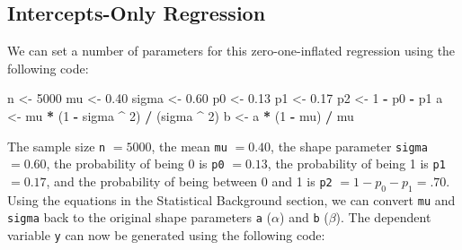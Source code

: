 \documentclass[english,man]{apa6}
\newenvironment{Shaded}{\begin{snugshade}}{\end{snugshade}}
\newcommand{\DecValTok}[1]{\textcolor[rgb]{0.00,0.00,0.81}{#1}}
\newcommand{\FloatTok}[1]{\textcolor[rgb]{0.00,0.00,0.81}{#1}}
\newcommand{\StringTok}[1]{\textcolor[rgb]{0.31,0.60,0.02}{#1}}
\newcommand{\OperatorTok}[1]{\textcolor[rgb]{0.81,0.36,0.00}{\textbf{#1}}}
\newcommand{\NormalTok}[1]{#1}
\theoremstyle{definition}
\theoremstyle{definition}
\theoremstyle{remark}
\begin{document}
\subsection{Intercepts-Only
Regression}\label{intercepts-only-regression}

We can set a number of parameters for this zero-one-inflated regression
using the following code:

\begin{Shaded}
\begin{Highlighting}[]
\NormalTok{n <-}\StringTok{ }\DecValTok{5000}
\NormalTok{mu <-}\StringTok{ }\FloatTok{0.40}
\NormalTok{sigma <-}\StringTok{ }\FloatTok{0.60}
\NormalTok{p0 <-}\StringTok{ }\FloatTok{0.13}
\NormalTok{p1 <-}\StringTok{ }\FloatTok{0.17}
\NormalTok{p2 <-}\StringTok{ }\DecValTok{1} \OperatorTok{-}\StringTok{ }\NormalTok{p0 }\OperatorTok{-}\StringTok{ }\NormalTok{p1}
\NormalTok{a <-}\StringTok{ }\NormalTok{mu }\OperatorTok{*}\StringTok{ }\NormalTok{(}\DecValTok{1} \OperatorTok{-}\StringTok{ }\NormalTok{sigma }\OperatorTok{^}\StringTok{ }\DecValTok{2}\NormalTok{) }\OperatorTok{/}\StringTok{ }\NormalTok{(sigma }\OperatorTok{^}\StringTok{ }\DecValTok{2}\NormalTok{)}
\NormalTok{b <-}\StringTok{ }\NormalTok{a }\OperatorTok{*}\StringTok{ }\NormalTok{(}\DecValTok{1} \OperatorTok{-}\StringTok{ }\NormalTok{mu) }\OperatorTok{/}\StringTok{ }\NormalTok{mu}
\end{Highlighting}
\end{Shaded}

The sample size \texttt{n} \(= 5000\), the mean \texttt{mu} \(= 0.40\),
the shape parameter \texttt{sigma} \(= 0.60\), the probability of being
0 is \texttt{p0} \(= 0.13\), the probability of being 1 is \texttt{p1}
\(= 0.17\), and the probability of being between 0 and 1 is \texttt{p2}
\(= 1 - p_0 - p_1 = .70\). Using the equations in the Statistical
Background section, we can convert \texttt{mu} and \texttt{sigma} back
to the original shape parameters \texttt{a} (\(\alpha\)) and \texttt{b}
(\(\beta\)). The dependent variable \texttt{y} can now be generated
using the following code:
\end{document}
